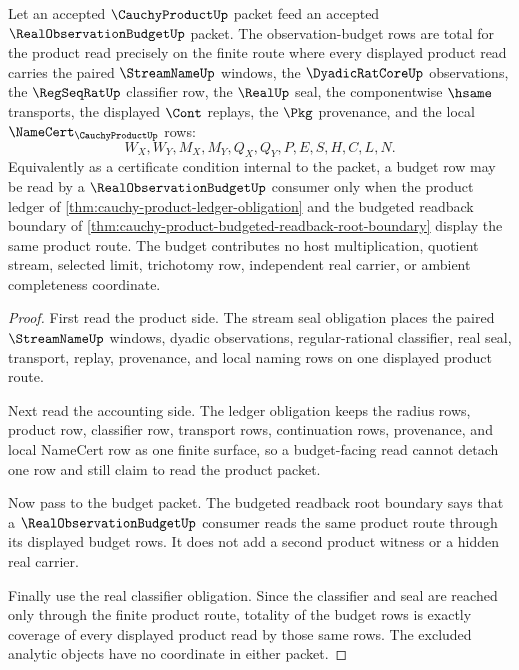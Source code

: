 \begin{theorem}
\label{thm:cauchy-product-root-observation-budget-totality}
Let an accepted $\CauchyProductUp$ packet feed an accepted $\RealObservationBudgetUp$ packet. The observation-budget rows are total for the product read precisely on the finite route where every displayed product read carries the paired $\StreamNameUp$ windows, the $\DyadicRatCoreUp$ observations, the $\RegSeqRatUp$ classifier row, the $\RealUp$ seal, the componentwise $\hsame$ transports, the displayed $\Cont$ replays, the $\Pkg$ provenance, and the local $\NameCert_{\CauchyProductUp}$ rows:
$$
W_X,W_Y,M_X,M_Y,Q_X,Q_Y,P,E,S,H,C,L,N.
$$
Equivalently as a certificate condition internal to the packet, a budget row may be read by a $\RealObservationBudgetUp$ consumer only when the product ledger of \autoref{thm:cauchy-product-ledger-obligation} and the budgeted readback boundary of \autoref{thm:cauchy-product-budgeted-readback-root-boundary} display the same product route. The budget contributes no host multiplication, quotient stream, selected limit, trichotomy row, independent real carrier, or ambient completeness coordinate.
\end{theorem}
\begin{proof}
First read the product side. The stream seal obligation places the paired $\StreamNameUp$ windows, dyadic observations, regular-rational classifier, real seal, transport, replay, provenance, and local naming rows on one displayed product route.

Next read the accounting side. The ledger obligation keeps the radius rows, product row, classifier row, transport rows, continuation rows, provenance, and local NameCert row as one finite surface, so a budget-facing read cannot detach one row and still claim to read the product packet.

Now pass to the budget packet. The budgeted readback root boundary says that a $\RealObservationBudgetUp$ consumer reads the same product route through its displayed budget rows. It does not add a second product witness or a hidden real carrier.

Finally use the real classifier obligation. Since the classifier and seal are reached only through the finite product route, totality of the budget rows is exactly coverage of every displayed product read by those same rows. The excluded analytic objects have no coordinate in either packet.
\end{proof}

